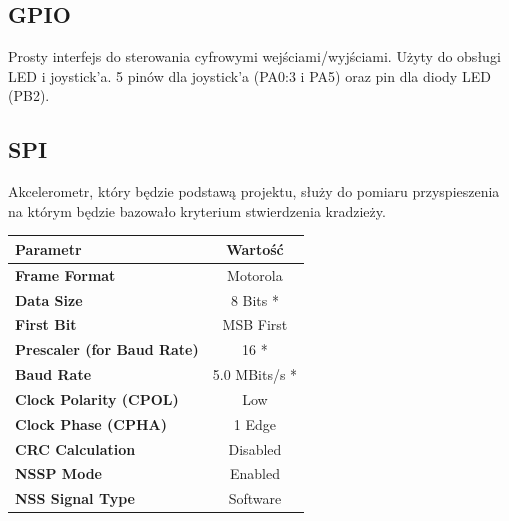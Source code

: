\documentclass[10pt, a4paper]{article}
\begin{document}
\subsection{GPIO}
Prosty interfejs do sterowania cyfrowymi wejściami/wyjściami. Użyty do obsługi LED i joystick'a. 5 pinów dla joystick'a (PA0:3 i PA5) oraz pin dla diody LED (PB2).
\newpage

\subsection{SPI}
Akcelerometr, który będzie podstawą projektu, służy do pomiaru przyspieszenia na którym będzie bazowało kryterium stwierdzenia kradzieży.

\begin{table}[H]
\centering
\begin{tabular}{|l|c|}
\hline
\textbf{Parametr} & Wartość \\
\hline
\hline
\textbf{Frame Format} & Motorola \\ \hline
\textbf{Data Size} & 8 Bits * \\ \hline
\textbf{First Bit} & MSB First \\ \hline
\textbf{Prescaler (for Baud Rate)} & 16 * \\ \hline
\textbf{Baud Rate} & 5.0 MBits/s * \\ \hline
\textbf{Clock Polarity (CPOL)} & Low \\ \hline
\textbf{Clock Phase (CPHA)} & 1 Edge \\ \hline
\textbf{CRC Calculation} & Disabled \\ \hline
\textbf{NSSP Mode} & Enabled \\ \hline
\textbf{NSS Signal Type} & Software \\ \hline
\end{tabular}
\end{table}
\end{document}
